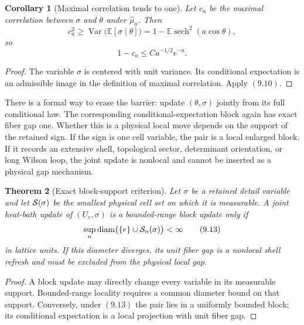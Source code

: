 \documentclass[11pt]{article}
\newtheorem{theorem}{Theorem}[section]
\newtheorem{corollary}[theorem]{Corollary}
\theoremstyle{remark}
\begin{document}
\begin{corollary}[Maximal correlation tends to one]
\label{cor:v15v9-correlation}
Let \(c_a\) be the maximal correlation between \(\sigma\) and
\(\theta\) under \(\widehat\mu_a\).  Then
\[
 c_a^2\ge
 \operatorname{Var}\bigl(\mathbb E[\sigma\mid\theta]\bigr)
 =1-\mathbb E\operatorname{sech}^2(a\cos\theta),             \tag{9.11}
\]
so
\[
 1-c_a\le Ca^{-1/2}e^{-a}.                                  \tag{9.12}
\]
\end{corollary}

\begin{proof}
The variable \(\sigma\) is centered with unit variance.  Its
conditional expectation is an admissible image in the definition
of maximal correlation.  Apply \((9.10)\).
\end{proof}

There is a formal way to erase the barrier: update
\((\theta,\sigma)\) jointly from its full conditional law.  The
corresponding conditional-expectation block again has exact fiber
gap one.  Whether this is a physical local move depends on the
support of the retained sign.  If the sign is one cell variable,
the pair is a local enlarged block.  If it records an extensive
shell, topological sector, determinant orientation, or long
Wilson loop, the joint update is nonlocal and cannot be inserted
as a physical gap mechanism.

\begin{theorem}[Exact block-support criterion]
\label{thm:v15v9-support}
Let \(\sigma\) be a retained detail variable and let
\({\cal S}(\sigma)\) be the smallest physical cell set on which it
is measurable.  A joint heat-bath update of \((U_e,\sigma)\) is a
bounded-range block update only if
\[
 \sup_n\operatorname{diam}
 \bigl(\{e\}\cup{\cal S}_n(\sigma)\bigr)<\infty               \tag{9.13}
\]
in lattice units.  If this diameter diverges, its unit fiber gap
is a nonlocal shell refresh and must be excluded from the physical
local gap.
\end{theorem}

\begin{proof}
A block update may directly change every variable in its
measurable support.  Bounded-range locality requires a common
diameter bound on that support.  Conversely, under \((9.13)\) the
pair lies in a uniformly bounded block; its conditional
expectation is a local projection with unit fiber gap.
\end{proof}
\end{document}
